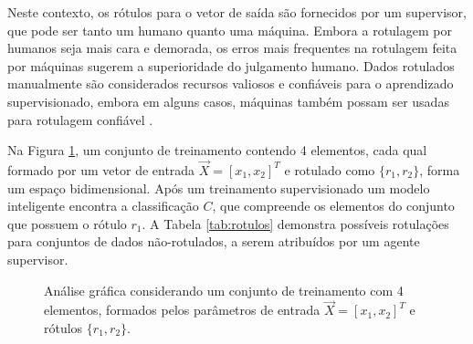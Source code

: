 \documentclass[
	12pt,				%
	openright,			%
	twoside,			%
	a4paper,			%
	tcc,			%
	]{ABNT-DC-UEL}
\begin{document}
Neste contexto, os rótulos para o vetor de saída são fornecidos por um supervisor, que pode ser tanto um humano quanto uma máquina. Embora a rotulagem por humanos seja mais cara e demorada, os erros mais frequentes na rotulagem feita por máquinas sugerem a superioridade do julgamento humano. Dados rotulados manualmente são considerados recursos valiosos e confiáveis para o aprendizado supervisionado, embora em alguns casos, máquinas também possam ser usadas para rotulagem confiável \cite{mohammed:16}.

Na Figura \ref{fig:plot-supervisionado}, um conjunto de treinamento contendo 4 elementos, cada qual formado por um vetor de entrada $\Vec{X} = [x_1,x_2]^T$ e rotulado como $\{r_1, r_2\}$, forma um espaço bidimensional. Após um treinamento supervisionado um modelo inteligente encontra a classificação $C$, que compreende os elementos do conjunto que possuem o rótulo $r_1$. A Tabela \ref{tab:rotulos} demonstra possíveis rotulações para conjuntos de dados não-rotulados, a serem atribuídos por um agente supervisor.

\begin{figure}[hbt]
    \centering
    \caption{Análise gráfica considerando um conjunto de treinamento com 4 elementos, formados pelos parâmetros de entrada $\Vec{X} = [x_1,x_2]^T$ e rótulos $\{r_1, r_2\}$.}
    \label{fig:plot-supervisionado}
\end{figure}
\end{document}
